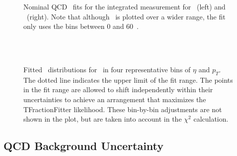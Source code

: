 \begin{figure}[phtb]
  \begin{center}
	 \caption{Nominal QCD \MET\ fits for the integrated measurement for \Wmunup~(left) and \Wmunum~(right). Note that although \MET\ is plotted over a wider range, the fit only uses the bins between 0 and 60~\GeV. }
 \label{fig:Wmunu:qcd_met_fits_int}
 \end{center}
\end{figure}

\begin{figure}[phtb]
  \begin{center}
     \\

     \\

    \caption{Fitted \MET\ distributions for \Wmunup\ in four representative bins of $\eta$ and $p_T$. The dotted line indicates the upper limit of the fit range. The points in the fit range are allowed to shift independently within their uncertainties to achieve an arrangement that maximizes the TFractionFitter likelihood. These bin-by-bin adjustments are not shown in the plot, but are taken into account in the $\chi^2$ calculation. }
    \label{fig:Wmunu:qcd_met_fits_sample_bins}
  \end{center}
\end{figure}

\subsection{QCD Background Uncertainty}

